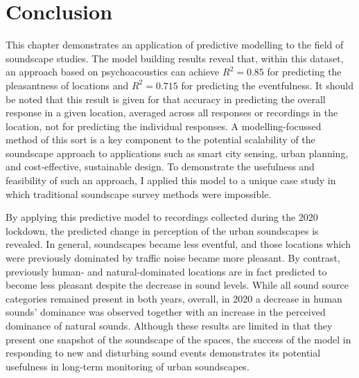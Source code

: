 
\section{Conclusion}

 This chapter demonstrates an application of predictive modelling to the field of soundscape studies. The model building results reveal that, within this dataset, an approach based on psychoacoustics can achieve $R^2=0.85$ for predicting the pleasantness of locations and $R^2=0.715$ for predicting the eventfulness. It should be noted that this result is given for that accuracy in predicting the overall response in a given location, averaged across all responses or recordings in the location, not for predicting the individual responses. A modelling-focussed method of this sort is a key component to the potential scalability of the soundscape approach to applications such as smart city sensing, urban planning, and cost-effective, sustainable design. To demonstrate the usefulness and feasibility of such an approach, I applied this model to a unique case study in which traditional soundscape survey methods were impossible.

 By applying this predictive model to recordings collected during the 2020 lockdown, the predicted change in perception of the urban soundscapes is revealed. In general, soundscapes became less eventful, and those locations which were previously dominated by traffic noise became more pleasant. By contrast, previously human- and natural-dominated locations are in fact predicted to become less pleasant despite the decrease in sound levels. While all sound source categories remained present in both years, overall, in 2020 a decrease in human sounds' dominance was observed together with an increase in the perceived dominance of natural sounds. Although these results are limited in that they present one snapshot of the soundscape of the spaces, the success of the model in responding to new and disturbing sound events demonstrates its potential usefulness in long-term monitoring of urban soundscapes. 


